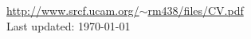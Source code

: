 \documentclass{scrartcl}	%
\begin{document}
\begin{cv}
\vfill

\begin{center}
{\footnotesize \href{http://www.srcf.ucam.org/~rm438/files/CV.pdf}{http://www.srcf.ucam.org/$\sim$rm438/files/CV.pdf}\\
Last updated: \today}
\end{center}



\enlargethispage{\baselineskip}
\end{cv}
\end{document}
